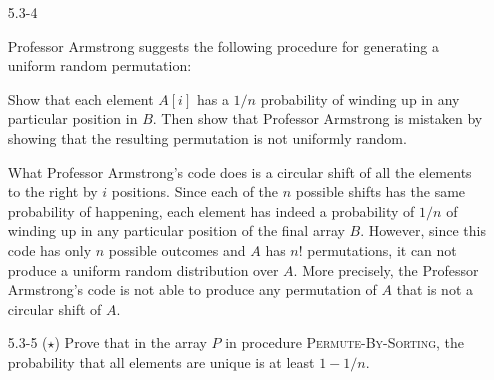 \begin{enumerate}
\newpage

\item[5.3{-}4]{Professor Armstrong suggests the following procedure for
generating a uniform random permutation:

\begin{algorithm}[H]
\SetAlgoNoEnd\DontPrintSemicolon
\BlankLine
{}
\end{algorithm}

Show that each element $A[i]$ has a $1/n$ probability of winding up in any
particular position in $B$. Then show that Professor Armstrong is mistaken by
showing that the resulting permutation is not uniformly random.
}

\begin{framed}
What Professor Armstrong's code does is a circular shift of all the elements to
the right by $i$ positions. Since each of the $n$ possible shifts has the same
probability of happening, each element has indeed a probability of $1/n$ of
winding up in any particular position of the final array $B$. However, since
this code has only $n$ possible outcomes and $A$ has $n!$ permutations, it can
not produce a uniform random distribution over $A$. More precisely, the
Professor Armstrong's code is not able to produce any permutation of $A$ that
is not a circular shift of $A$.
\end{framed}

\item[5.3{-}5]{($\star$) Prove that in the array $P$ in procedure
\textsc{Permute-By-Sorting}, the probability that all elements are unique is at
least $1 - 1/n$.}


\end{enumerate}
